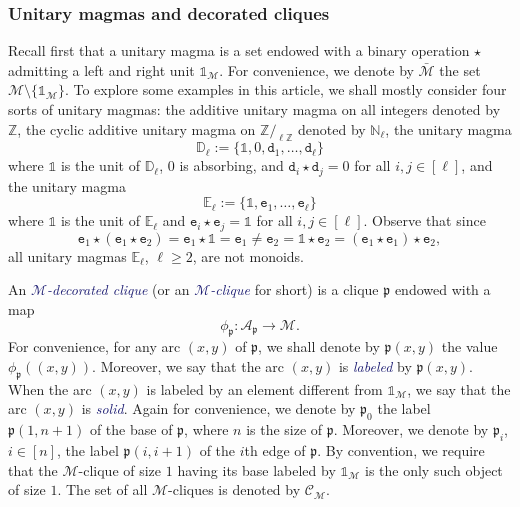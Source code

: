 \documentclass[10pt,reqno]{amsart}
\numberwithin{equation}{subsection}
\renewcommand{\geq}{\geqslant}
\newcommand{\N}{\mathbb{N}}
\newcommand{\Z}{\mathbb{Z}}
\newcommand{\Mca}{\mathcal{M}}
\newcommand{\Dbb}{\mathbb{D}}
\newcommand{\Ebb}{\mathbb{E}}
\newcommand{\Pfr}{\mathfrak{p}}
\newcommand{\Dtt}{\mathtt{d}}
\newcommand{\Ett}{\mathtt{e}}
\newcommand{\Unit}{\mathds{1}}
\newcommand{\Op}{\star}
\newcommand{\Arcs}{\mathcal{A}}
\newcommand{\Cliques}{\mathcal{C}}
\newcommand{\Def}[1]{\textcolor{MidnightBlue}{\em #1}}
\begin{document}
\subsubsection{Unitary magmas and decorated cliques}
Recall first that a unitary magma is a set endowed with a binary
operation $\Op$ admitting a left and right unit $\Unit_\Mca$. For
convenience, we denote by $\bar{\Mca}$ the set
$\Mca \setminus \{\Unit_\Mca\}$. To explore some examples in this
article, we shall mostly consider four sorts of unitary magmas: the
additive unitary magma on all integers denoted by $\Z$, the cyclic
additive unitary magma on $\Z/_{\ell \Z}$ denoted by $\N_\ell$, the
unitary magma
\begin{equation}
    \Dbb_\ell := \{\Unit, 0, \Dtt_1, \dots, \Dtt_\ell\}
\end{equation}
where $\Unit$ is the unit of $\Dbb_\ell$, $0$ is absorbing, and
$\Dtt_i \Op \Dtt_j = 0$ for all $i, j \in [\ell]$, and the unitary magma
\begin{equation}
    \Ebb_\ell := \{\Unit, \Ett_1, \dots, \Ett_\ell\}
\end{equation}
where $\Unit$ is the unit of $\Ebb_\ell$ and $\Ett_i \Op \Ett_j = \Unit$
for all $i, j \in [\ell]$. Observe that since
\begin{equation}
    \Ett_1 \Op (\Ett_1 \Op \Ett_2) = \Ett_1 \Op \Unit = \Ett_1
    \ne
    \Ett_2 = \Unit \Op \Ett_2 = (\Ett_1 \Op \Ett_1) \Op \Ett_2,
\end{equation}
all unitary magmas $\Ebb_\ell$, $\ell \geq 2$, are not monoids.
\medskip

An \Def{$\Mca$-decorated clique} (or an \Def{$\Mca$-clique} for short)
is a clique $\Pfr$ endowed with a map
\begin{equation}
    \phi_\Pfr : \Arcs_\Pfr \to \Mca.
\end{equation}
For convenience, for any arc $(x, y)$ of $\Pfr$, we shall denote by
$\Pfr(x, y)$ the value $\phi_\Pfr((x, y))$. Moreover, we say that the
arc $(x, y)$ is \Def{labeled} by $\Pfr(x, y)$. When the arc $(x, y)$ is
labeled by an element different from  $\Unit_\Mca$, we say that the arc
$(x, y)$ is \Def{solid}. Again for convenience, we denote by $\Pfr_0$
the label $\Pfr(1, n + 1)$ of the base of $\Pfr$, where $n$ is the size
of $\Pfr$. Moreover, we denote by $\Pfr_i$, $i \in [n]$, the label
$\Pfr(i, i + 1)$ of the $i$th edge of $\Pfr$. By convention, we
require that the $\Mca$-clique of size $1$ having its base labeled by
$\Unit_\Mca$ is the only such object of size $1$. The set of all
$\Mca$-cliques is denoted by $\Cliques_\Mca$.
\medskip
\end{document}
